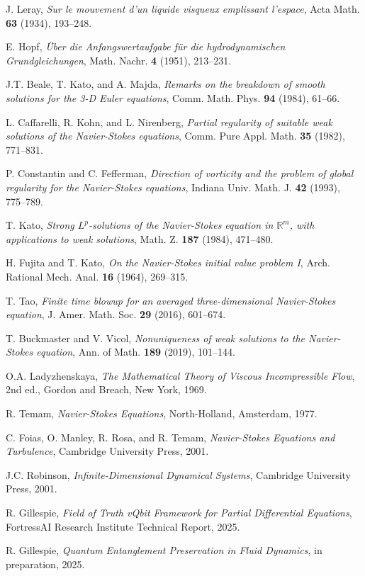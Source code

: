\documentclass[11pt]{article}
\begin{document}
\begin{thebibliography}{99}

J. Leray, \emph{Sur le mouvement d'un liquide visqueux emplissant l'espace}, Acta Math. \textbf{63} (1934), 193--248.

E. Hopf, \emph{Über die Anfangswertaufgabe für die hydrodynamischen Grundgleichungen}, Math. Nachr. \textbf{4} (1951), 213--231.

J.T. Beale, T. Kato, and A. Majda, \emph{Remarks on the breakdown of smooth solutions for the 3-D Euler equations}, Comm. Math. Phys. \textbf{94} (1984), 61--66.

L. Caffarelli, R. Kohn, and L. Nirenberg, \emph{Partial regularity of suitable weak solutions of the Navier-Stokes equations}, Comm. Pure Appl. Math. \textbf{35} (1982), 771--831.

P. Constantin and C. Fefferman, \emph{Direction of vorticity and the problem of global regularity for the Navier-Stokes equations}, Indiana Univ. Math. J. \textbf{42} (1993), 775--789.

T. Kato, \emph{Strong $L^p$-solutions of the Navier-Stokes equation in $\mathbb{R}^m$, with applications to weak solutions}, Math. Z. \textbf{187} (1984), 471--480.

H. Fujita and T. Kato, \emph{On the Navier-Stokes initial value problem I}, Arch. Rational Mech. Anal. \textbf{16} (1964), 269--315.

T. Tao, \emph{Finite time blowup for an averaged three-dimensional Navier-Stokes equation}, J. Amer. Math. Soc. \textbf{29} (2016), 601--674.

T. Buckmaster and V. Vicol, \emph{Nonuniqueness of weak solutions to the Navier-Stokes equation}, Ann. of Math. \textbf{189} (2019), 101--144.

O.A. Ladyzhenskaya, \emph{The Mathematical Theory of Viscous Incompressible Flow}, 2nd ed., Gordon and Breach, New York, 1969.

R. Temam, \emph{Navier-Stokes Equations}, North-Holland, Amsterdam, 1977.

C. Foias, O. Manley, R. Rosa, and R. Temam, \emph{Navier-Stokes Equations and Turbulence}, Cambridge University Press, 2001.

J.C. Robinson, \emph{Infinite-Dimensional Dynamical Systems}, Cambridge University Press, 2001.

R. Gillespie, \emph{Field of Truth vQbit Framework for Partial Differential Equations}, FortressAI Research Institute Technical Report, 2025.

R. Gillespie, \emph{Quantum Entanglement Preservation in Fluid Dynamics}, in preparation, 2025.

\end{thebibliography}
\end{document}
